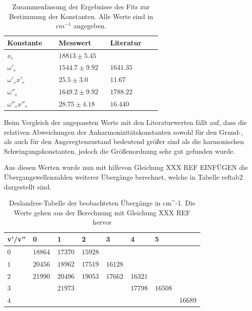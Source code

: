 \begin{table}[H]

 
 \caption{Zusammenfassung der Ergebnisse des Fits zur Bestimmung der Konstanten. Alle Werte sind in $cm^{-1}$ angegeben.}
\begin{tabular}{C{0.3\linewidth}|C{0.3\linewidth}C{0.3\linewidth}}

 
 Konstante &  Messwert &  Literatur \cite{Lit} \\
  \hline \addlinespace[1ex] 
$\nu_e$ & $18813 \pm 5.45$ & \\
$\omega'_e$ & $1544.7 \pm9.92$ & $1641.35$ \\
$\omega'_e x'_e$ & $25.5 \pm 3.0$ &  $11.67$ \\
$\omega''_e$ & $1649.2 \pm 9.92$ & $1788.22$ \\
$\omega''_e x''_e$ & $28.75 \pm 4.18$ & $16.440$ \\
 
   
 \end{tabular}
 \label{tab1}
 \end{table}

Beim Vergleich der angepassten Werte mit den Literaturwerten fällt auf, dass die relativen Abweichungen der Anharmonizitätskonstanten sowohl für den  Grund-, als auch für den  Angeregtenzustand bedeutend größer sind als die harmonischen Schwingungskonstanten, jedoch die Größenordnung sehr gut gefunden wurde. 

Aus diesen Werten wurde nun mit hilfevon Gleichung XXX REF EINFÜGEN die Übergangswellenzahlen weiterer Übergänge berechnet, welche in Tabelle ref{tab2} dargestellt sind.



\begin{table}[H]
 
\caption{Deslandres-Tabelle der beobachteten Übergänge in cm^{-1}. Die Werte gehen aus der Berechnung mit Gleichung XXX REF hervor}
\begin{tabular}{L{0.1\linewidth}|L{0.1\linewidth}L{0.1\linewidth}L{0.1\linewidth}L{0.1\linewidth}L{0.1\linewidth}L{0.1\linewidth}L{0.1\linewidth}}

 
v'/v'' & 0 & 1 & 2 & 3 & 4 & 5 \\
\hline \addlinespace[1ex]
$0$ & $18864$ & $17370$ & $15928$ &  $ $ & $ $ & $ $ &  \\
$1$ & $20456$ & $18962$ & $17519$ & $16128$ & $ $ & $ $ &  \\
$2$ & $21990$ & $20496$ & $19053$ & $17662$ & $16321$ & $ $ &  \\
$3$ & $ $& $21973$ & & & $17798$ & $16508$ & \\
$4$ & $ $ & $ $ & $ $ & $ $ & $ $ & $ $ & $16689$ \\
 
   
 \end{tabular}
 \label{tab2}
 \end{table}





